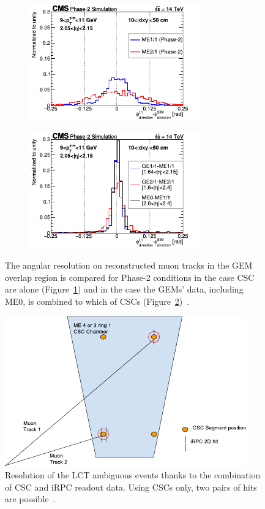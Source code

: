 	\begin{figure}[H]
		\begin{subfigure}{0.5\linewidth}
			\centering
			\includegraphics[height=5cm]{fig/chapt3/CSC-angular-res.pdf}
			\caption{\label{fig:CSC-GEM-res:A}}
		\end{subfigure}
		\begin{subfigure}{0.5\linewidth}
			\centering
			\includegraphics[height=5cm]{fig/chapt3/GEM-angular-res.pdf}
			\caption{\label{fig:CSC-GEM-res:B}}
		\end{subfigure}
		\caption{\label{fig:CSC-GEM-res} The angular resolution on reconstructed muon tracks in the GEM overlap region  is compared for Phase-2 conditions in the case CSC are alone (Figure~\ref{fig:CSC-GEM-res:A}) and in the case the GEMs' data, including ME0, is combined to which of CSCs (Figure~\ref{fig:CSC-GEM-res:B})~\cite{PHASEIITP}.}
	\end{figure}

	\begin{figure}[H]
		\centering
		\includegraphics[width=.8\linewidth]{fig/chapt3/CSC-LCT-ambiguity.pdf}
		\caption{\label{fig:LCT-ambiguity} Resolution of the LCT ambiguous events thanks to the combination of CSC and iRPC readout data. Using CSCs only, two pairs of hits are possible~\cite{PHASEIITP}.}
	\end{figure}


